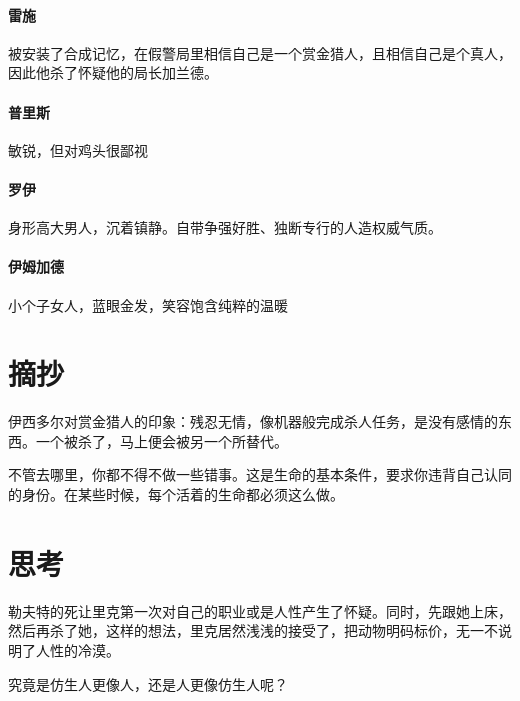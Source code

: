 	\paragraph{雷施}
被安装了合成记忆，在假警局里相信自己是一个赏金猎人，且相信自己是个真人，因此他杀了怀疑他的局长加兰德。

	\paragraph{普里斯}
敏锐，但对鸡头很鄙视

	\paragraph{罗伊}
身形高大男人，沉着镇静。自带争强好胜、独断专行的人造权威气质。

	\paragraph{伊姆加德}
小个子女人，蓝眼金发，笑容饱含纯粹的温暖

\section{摘抄}
{\heiti 伊西多尔对赏金猎人的印象：残忍无情，像机器般完成杀人任务，是没有感情的东西。一个被杀了，马上便会被另一个所替代。

不管去哪里，你都不得不做一些错事。这是生命的基本条件，要求你违背自己认同的身份。在某些时候，每个活着的生命都必须这么做。}
\section{思考}
勒夫特的死让里克第一次对自己的职业或是人性产生了怀疑。同时，先跟她上床，然后再杀了她，这样的想法，里克居然浅浅的接受了，把动物明码标价，无一不说明了人性的冷漠。

究竟是仿生人更像人，还是人更像仿生人呢？